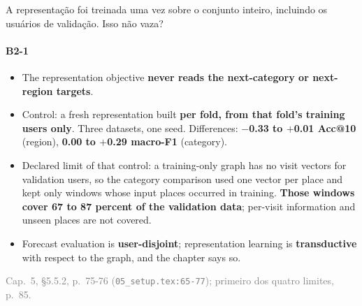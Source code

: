 \documentclass{beamer}
\begin{document}
\begin{frame}[noframenumbering]{A representação foi treinada uma vez sobre o conjunto inteiro, incluindo os usuários de validação. Isso não vaza?}
    \framesubtitle{B2-1}
    \hypertarget{b21}{}
    \small
    \begin{itemize}\setlength{\itemsep}{0pt}\setlength{\parskip}{0pt}
        \item The representation objective \textbf{never reads the next-category or next-region targets}.
        \item Control: a fresh representation built \textbf{per fold, from that fold's training users only}. Three datasets, one seed. Differences: \textbf{$-$0.33 to $+$0.01 Acc@10} (region), \textbf{0.00 to $+$0.29 macro-F1} (category).
        \item Declared limit of that control: a training-only graph has no visit vectors for validation users, so the category comparison used one vector per place and kept only windows whose input places occurred in training. \textbf{Those windows cover 67 to 87 percent of the validation data}; per-visit information and unseen places are not covered.
        \item Forecast evaluation is \textbf{user-disjoint}; representation learning is \textbf{transductive} with respect to the graph, and the chapter says so.
    \end{itemize}
    \vfill
    {\scriptsize
    \begin{minipage}[b]{0.775\linewidth}\raggedright\textcolor{gray}{Cap.~5, §5.5.2, p.~75-76 (\texttt{05\_setup.tex:65-77}); primeiro dos quatro limites, p.~85.}\end{minipage}\hfill
    \begin{minipage}[b]{0.20\linewidth}\raggedleft \hyperlink{b0}{}\end{minipage}}
\end{frame}
\end{document}
